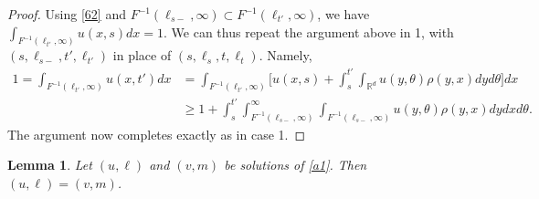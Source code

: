 \documentclass[11pt]{amsart}
\theoremstyle{plain}
\newtheorem{lemma}[theorem]{Lemma}
\newcommand{\R}{{\mathbb R}}
\newcommand{\iy}{\infty}
\newcommand{\F}{F}
\begin{document}
\begin{proof}
Using \eqref{62} and $\F^{-1}(\ell_{s-},\iy)\subset \F^{-1}(\ell_{t'},\iy)$,
we have $\int_{\F^{-1}(\ell_{t'},\iy)} u(x,s)dx=1$.
We can thus repeat the argument above in 1, with
$(s,\ell_{s-},t',\ell_{t'})$ in place of $(s,\ell_s,t,\ell_t)$.
Namely,
\begin{align*}
1=\int_{\F^{-1}(\ell_{t'},\iy)} u(x,t')dx&=\int_{\F^{-1}(\ell_{t'},\iy)} \Big[u(x,s)
+\int_s^{t'}\int_{\R^d} u(y,\theta)\rho(y,x)dy d\theta \Big]dx\\
&\ge
1 +\int_s^{t'}\int_{\F^{-1}(\ell_{s-},\iy)}^\iy\int_{\F^{-1}(\ell_{s-},\iy)} u(y,\theta)\rho(y,x)dy dx d\theta.
\end{align*}
The argument now completes exactly as in case 1.
\end{proof}

\begin{lemma}\label{lem52}
Let $(u,\ell)$ and $(v,m)$ be solutions of \eqref{a1}.
Then $(u,\ell)=(v,m)$.
\end{lemma}
\end{document}
